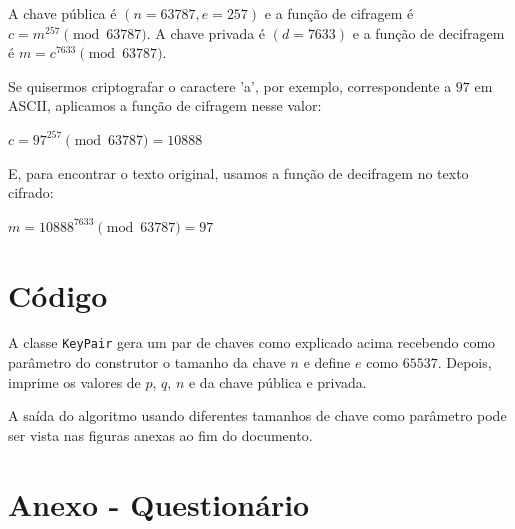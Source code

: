 \documentclass[12pt]{article}
\begin{document}
A chave pública é $(n = 63787, e = 257)$ e a função de cifragem é
$c = m^{257} \pmod{63787}$. A chave privada é $(d = 7633)$ e a função de
decifragem é $m = c^{7633} \pmod{63787}$.

Se quisermos criptografar o caractere 'a', por exemplo, correspondente a $97$
em ASCII, aplicamos a função de cifragem nesse valor:

\begin{center}
    $c = 97^{257} \pmod{63787} = 10888$
\end{center}

E, para encontrar o texto original, usamos a função de decifragem no texto
cifrado:

\begin{center}
    $m = 10888^{7633} \pmod{63787} = 97$
\end{center}

\section{Código}

A classe \texttt{KeyPair} gera um par de chaves como explicado acima recebendo
como parâmetro do construtor o tamanho da chave $n$ e define $e$ como $65537$.
Depois, imprime os valores de $p$, $q$, $n$ e da chave pública e privada.



A saída do algoritmo usando diferentes tamanhos de chave como parâmetro pode
ser vista nas figuras anexas ao fim do documento.

\section*{Anexo - Questionário}
\end{document}

